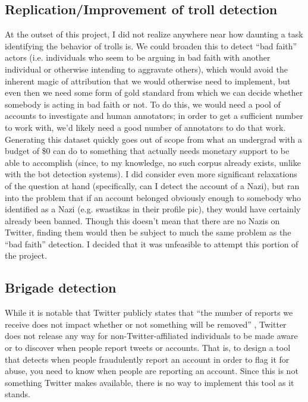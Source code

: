 \documentclass[11pt]{article}
\begin{document}
\subsection{Replication/Improvement of troll detection}
At the outset of this project, I did not realize anywhere near how daunting a task identifying the behavior of trolls is. We could broaden this to detect ``bad faith'' actors (i.e. individuals who seem to be arguing in bad faith with another individual or otherwise intending to aggravate others), which would avoid the inherent magic of attribution that we would otherwise need to implement, but even then we need some form of gold standard from which we can decide whether somebody is acting in bad faith or not. To do this, we would need a pool of accounts to investigate and human annotators; in order to get a sufficient number to work with, we'd likely need a good number of annotators to do that work. Generating this dataset quickly goes out of scope from what an undergrad with a budget of \$0 can do to something that actually needs monetary support to be able to accomplish (since, to my knowledge, no such corpus already exists, unlike with the bot detection systems). I did consider even more significant relaxations of the question at hand (specifically, can I detect the account of a Nazi), but ran into the problem that if an account belonged obviously enough to somebody who identified as a Nazi (e.g. swastikas in their profile pic), they would have certainly already been banned. Though this doesn't mean that there are no Nazis on Twitter, finding them would then be subject to much the same problem as the ``bad faith'' detection. I decided that it was unfeasible to attempt this portion of the project.

\subsection{Brigade detection}
While it is notable that Twitter publicly states that ``the number of reports we receive does not impact whether or not something will be removed'' \cite{twitter-policy}, Twitter does not release any way for non-Twitter-affiliated individuals to be made aware or to discover when people report tweets or accounts. That is, to design a tool that detects when people fraudulently report an account in order to flag it for abuse, you need to know when people are reporting an account. Since this is not something Twitter makes available, there is no way to implement this tool as it stands.
\end{document}
